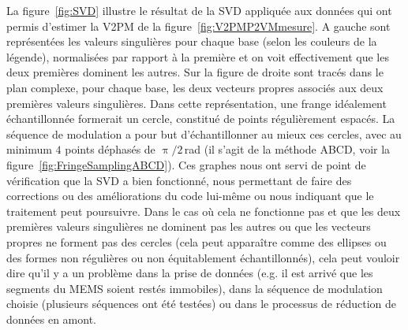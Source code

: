 La figure~\ref{fig:SVD} illustre le résultat de la \ac{SVD} appliquée aux données qui ont permis d'estimer la \ac{V2PM} de la figure~\ref{fig:V2PMP2VMmesure}. A gauche sont représentées les valeurs singulières pour chaque base (selon les couleurs de la légende), normalisées par rapport à la première et on voit effectivement que les deux premières dominent les autres. Sur la figure de droite sont tracés dans le plan complexe, pour chaque base, les deux vecteurs propres associés aux deux premières valeurs singulières. Dans cette représentation, une frange idéalement échantillonnée formerait un cercle, constitué de points régulièrement espacés. La séquence de modulation a pour but d'échantillonner au mieux ces cercles, avec au minimum $4$ points déphasés de $\uppi / 2 \,$rad (il s'agit de la méthode ABCD, voir la figure~\ref{fig:FringeSamplingABCD}). Ces graphes nous ont servi de point de vérification que la \ac{SVD} a bien fonctionné, nous permettant de faire des corrections ou des améliorations du code lui-même ou nous indiquant que le traitement peut poursuivre. Dans le cas où cela ne fonctionne pas et que les deux premières valeurs singulières ne dominent pas les autres ou que les vecteurs propres ne forment pas des cercles (cela peut apparaître comme des ellipses ou des formes non régulières ou non équitablement échantillonnés), cela peut vouloir dire qu'il y a un problème dans la prise de données (e.g. il est arrivé que les segments du \ac{MEMS} soient restés immobiles), dans la séquence de modulation choisie (plusieurs séquences ont été testées) ou dans le processus de réduction de données en amont.

